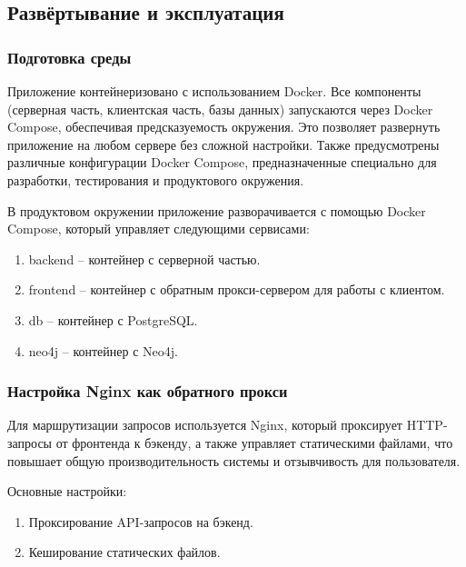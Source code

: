 

\subsection{Развёртывание и эксплуатация}

\subsubsection{Подготовка среды}

Приложение контейнеризовано с использованием Docker.
Все компоненты (серверная часть, клиентская часть, базы данных) запускаются через Docker Compose, обеспечивая предсказуемость окружения.
Это позволяет развернуть приложение на любом сервере без сложной настройки.
Также предусмотрены различные конфигурации Docker Compose, предназначенные специально для разработки, тестирования и продуктового окружения.

В продуктовом окружении приложение разворачивается с помощью Docker Compose, который управляет следующими сервисами:
\begin{enumerate}
\item backend -- контейнер с серверной частью.
\item frontend -- контейнер с обратным прокси-сервером для работы с клиентом.
\item db -- контейнер с PostgreSQL.
\item neo4j -- контейнер с Neo4j.
\end{enumerate}

\subsubsection{Настройка Nginx как обратного прокси}

Для маршрутизации запросов используется Nginx, который проксирует HTTP-запросы от фронтенда к бэкенду, а также управляет статическими файлами, что повышает общую производительность системы и отзывчивость для пользователя.

Основные настройки:
\begin{enumerate}
\item Проксирование API-запросов на бэкенд.
\item Кеширование статических файлов.
\end{enumerate}

